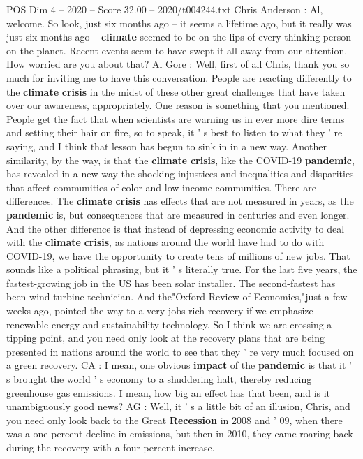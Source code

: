 \begin{textsample}{POS Dim 4 – 2020 – Score 32.00 – 2020/t004244.txt}  \label{ex:f4_pos_022}
Chris Anderson : Al, welcome.
So look, just six months ago -- it seems a lifetime ago, but it really was just six months ago -- \textbf{climate} seemed to be on the lips of every thinking person on the planet.
Recent events seem to have swept it all away from our attention.
How worried are you about that?
Al Gore : Well, first of all Chris, thank you so much for inviting me to have this conversation.
People are reacting differently to the \textbf{climate} \textbf{crisis} in the midst of these other great challenges that have taken over our awareness, appropriately.
One reason is something that you mentioned.
People get the fact that when scientists are warning us in ever more dire terms and setting their hair on fire, so to speak, it ' s best to listen to what they ' re saying, and I think that lesson has begun to sink in in a new way.
Another similarity, by the way, is that the \textbf{climate} \textbf{crisis}, like the COVID-19 \textbf{pandemic}, has revealed in a new way the shocking injustices and inequalities and disparities that affect communities of color and low-income communities.
There are differences.
The \textbf{climate} \textbf{crisis} has effects that are not measured in years, as the \textbf{pandemic} is, but consequences that are measured in centuries and even longer.
And the other difference is that instead of depressing economic activity to deal with the \textbf{climate} \textbf{crisis}, as nations around the world have had to do with COVID-19, we have the opportunity to create tens of millions of new jobs.
That sounds like a political phrasing, but it ' s literally true.
For the last five years, the fastest-growing job in the US has been solar installer.
The second-fastest has been wind turbine technician.
And the"Oxford Review of Economics,"just a few weeks ago, pointed the way to a very jobs-rich recovery if we emphasize renewable energy and sustainability technology.
So I think we are crossing a tipping point, and you need only look at the recovery plans that are being presented in nations around the world to see that they ' re very much focused on a green recovery.
CA : I mean, one obvious \textbf{impact} of the \textbf{pandemic} is that it ' s brought the world ' s economy to a shuddering halt, thereby reducing greenhouse gas emissions.
I mean, how big an effect has that been, and is it unambiguously good news?
AG : Well, it ' s a little bit of an illusion, Chris, and you need only look back to the Great \textbf{Recession} in 2008 and ' 09, when there was a one percent decline in emissions, but then in 2010, they came roaring back during the recovery with a four percent increase.

\end{textsample}
